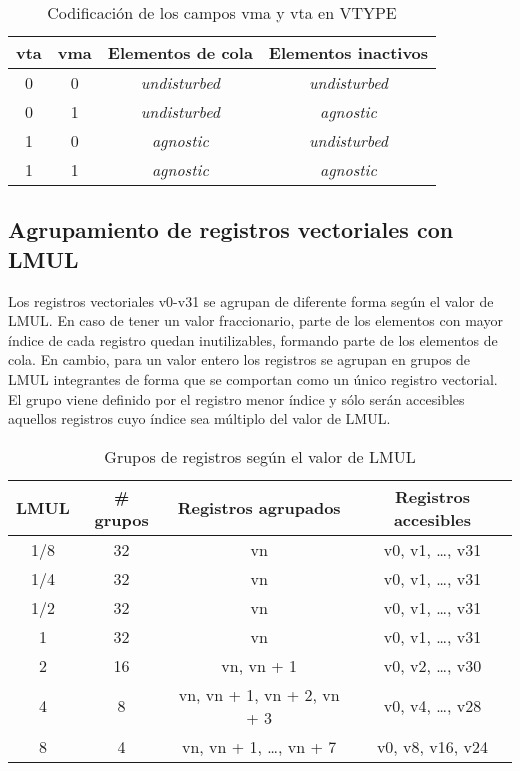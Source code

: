 \begin{table}[H]
    \begin{tabular}{@{}cccc@{}}
    \toprule
    vta & vma & Elementos de cola & Elementos inactivos\\
    \midrule
    0 & 0 & \textit{undisturbed} & \textit{undisturbed}\\
    0 & 1 & \textit{undisturbed} & \textit{agnostic}\\
    1 & 0 & \textit{agnostic} & \textit{undisturbed}\\
    1 & 1 & \textit{agnostic} & \textit{agnostic}\\
    \bottomrule
    \end{tabular}
    \caption{Codificación de los campos vma y vta  en VTYPE}
\end{table}


\subsection{Agrupamiento de registros vectoriales con LMUL}\label{mapping-registers-with-lmul}

Los registros vectoriales v0-v31 se agrupan de diferente forma según el valor
de LMUL. En caso de tener un valor fraccionario, parte de los elementos con mayor índice de cada registro quedan
inutilizables, formando parte de los elementos de cola. En cambio, para un valor entero
los registros se agrupan en grupos de LMUL integrantes de forma que se comportan como un
único registro vectorial. El grupo viene definido por el registro menor índice
y sólo serán accesibles aquellos registros cuyo índice sea múltiplo del valor
de LMUL\@.

\begin{table}[H]
    \begin{tabular}{@{}cccc@{}}
    \toprule
    LMUL & \# grupos & Registros agrupados & Registros accesibles\\
    \midrule
    1/8 & 32 & vn & v0, v1, \dots, v31\\
    1/4 & 32 & vn & v0, v1, \dots, v31\\
    1/2 & 32 & vn & v0, v1, \dots, v31\\
    1   & 32 & vn & v0, v1, \dots, v31\\
    2   & 16 & vn, vn + 1 & v0, v2, \dots, v30\\
    4   & 8  & vn, vn + 1, vn + 2, vn + 3 & v0, v4, \dots, v28\\
    8   & 4  & vn, vn + 1, \dots, vn + 7  & v0, v8, v16, v24\\
    \bottomrule
    \end{tabular}
    \caption{Grupos de registros según el valor de LMUL}
\end{table}

